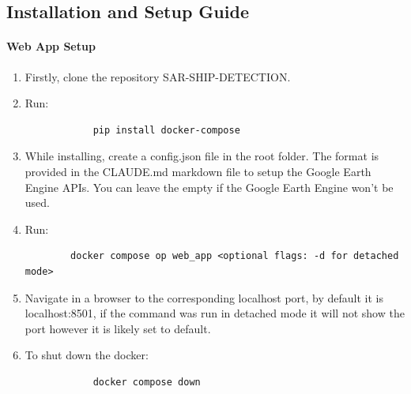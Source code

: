 \documentclass{article}
\begin{document}
	
	\subsection{Installation and Setup Guide}
	\paragraph{Web App Setup}
	
	\begin{enumerate}
		\item Firstly, clone the repository SAR-SHIP-DETECTION.
		\item Run:
		\begin{lstlisting}
			pip install docker-compose
		\end{lstlisting}
		\item While installing, create a config.json file in the root folder. The format is provided in the CLAUDE.md markdown file to setup the Google Earth Engine APIs. You can leave the empty if the Google Earth Engine won’t be used. 
		\item Run:
		\begin{lstlisting}
		docker compose op web_app <optional flags: -d for detached mode>
		\end{lstlisting}
		\item Navigate in a browser to the corresponding localhost port, by default it is localhost:8501, if the command was run in detached mode it will not show the port however it is likely set to default.
		\item To shut down the docker:
		\begin{lstlisting}
			docker compose down
		\end{lstlisting}
	\end{enumerate}
	
	
	
	
	
	
\end{document}
